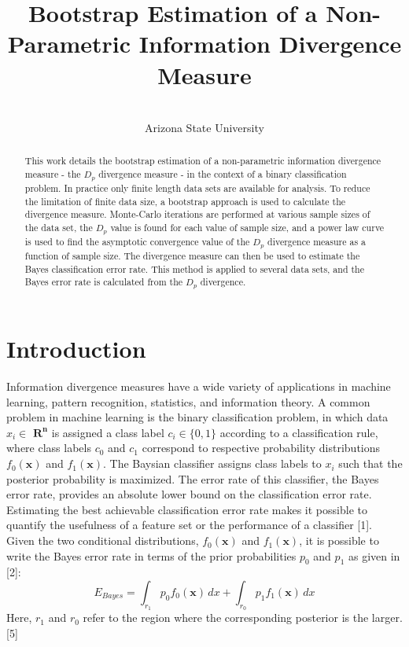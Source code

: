 \documentclass{article}
\begin{document}
	\title{Bootstrap Estimation of a Non-Parametric Information Divergence Measure}
	\author { \\
		\small Arizona State University}
	\date{}
	\maketitle

	\begin{abstract}
		\noindent 
		This work details the bootstrap estimation of a non-parametric information divergence measure - the $D_p$ divergence measure - in the context of a binary classification problem. In practice only finite length data sets are available for analysis. To reduce the limitation of finite data size, a bootstrap approach is used to calculate the divergence measure. Monte-Carlo iterations are performed at various sample sizes of the data set, the $D_p$ value is found for each value of sample size, and a power law curve is used to find the asymptotic convergence value of the $D_p$ divergence measure as a function of sample size. The divergence measure can then be used to estimate the Bayes classification error rate. This method is applied to several data sets, and the Bayes error rate is calculated from the $D_p$ divergence.
	\end{abstract}

		\section*{Introduction}
		\noindent
		Information divergence measures have a wide variety of applications in machine learning, pattern recognition, statistics, and information theory. A common problem in machine learning is the binary classification problem, in which data $x_i\in$ $\mathbf{R^n}$ is assigned a class label $c_i \in \{0,1\}$ according to a classification rule, where class labels $c_0$ and $c_1$ correspond to respective probability distributions $f_0(\textbf{x})$ and $f_1(\textbf{x})$. The Baysian classifier assigns class labels to $x_i$ such that the posterior probability is maximized. The error rate of this classifier, the Bayes error rate, provides an absolute lower bound on the classification error rate.  Estimating the best achievable classification error rate makes it possible to quantify the usefulness of a feature set or the performance of a classifier [1]. 
		\noindent
		Given the two conditional distributions, $f_0(\textbf{x})$ and $f_1(\textbf{x})$, it is possible to write the Bayes error rate in terms of the prior probabilities $p_0$ and $p_1$ as given in [2]:
		\begin{equation} E_{Bayes}=\int_{r_1} p_0f_0(\textbf{x}) \,dx + \int_{r_0} p_1f_1(\textbf{x}) \,dx	\end{equation}
		Here, $r_1$ and $r_0$ refer to the region where the corresponding posterior is the larger.[5]
\end{document}
